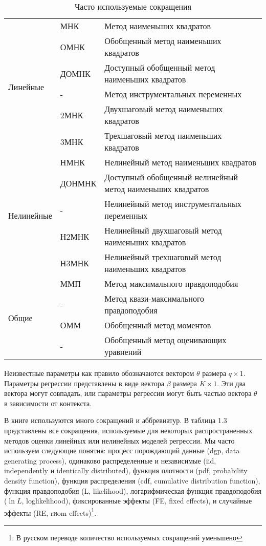\begin{table}[h]
\caption{Часто используемые сокращения}
\label{tab:abbrev}
\begin{tabular}{@{}lll@{}}
\toprule
 \multirow{6}{*}{Линейные} & МНК & Метод наименьших квадратов  \\
 & ОМНК & Обобщенный метод наименьших квадратов \\
 & ДОМНК & Доступный обобщенный метод наименьших квадратов \\
 & - & Метод инструментальных переменных \\
 & 2МНК & Двухшаговый метод наименьших квадратов \\
 & 3МНК & Трехшаговый метод наименьших квадратов \\ \midrule
 \multirow{5}{*}{Нелинейные} & НМНК & Нелинейный метод наименьших квадратов \\
 & ДОНМНК & Доступный обобщенный нелинейный метод наименьших квадратов \\
 & - & Нелинейный метод инструментальных переменных \\
 & Н2МНК & Нелинейный двухшаговый метод наименьших квадратов \\
 & Н3МНК & Нелинейный трехшаговый метод наименьших квадратов \\ \midrule
 \multirow{4}{*}{Общие} & ММП & Метод максимального правдоподобия \\
 & - & Метод квази-максимального правдоподобия \\
 & ОММ & Обобщенный метод моментов \\
 & - & Обобщенный метод оценивающих уравнений \\ \bottomrule
\end{tabular}
\end{table}

Неизвестные параметры как правило обозначаются вектором $\theta$ размера $q\times 1$.  Параметры регрессии представлены в виде   вектора $ \beta $ размера $ K \times 1 $. Эти два вектора могут совпадать, или параметры регрессии могут быть частью вектора $\theta$ в зависимости от контекста.


В книге используются много сокращений и аббревиатур. В таблица 1.3 представлены все сокращения, используемые для некоторых распространенных методов оценки  линейных или нелинейных моделей регрессии. Мы часто используем следующие понятия: процесс порождающий данные (dgp, data generating process), одинаково распределенные и независимые (iid, independently и identically distributed), функция плотности (pdf, probability density function), функция распределения (cdf, cumulative distribution function), функция правдоподобия (L, likelihood), логарифмическая функция правдоподобия ($\ln L$, loglikelihood), фиксированные эффекты (FE, fixed effects), и случайные эффекты (RE, rиom effects)\footnote{В русском переводе количество используемых сокращений уменьшено}.









